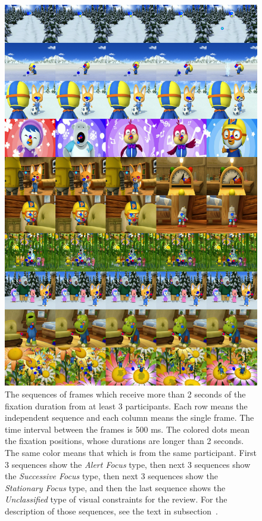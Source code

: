 \documentclass[10pt,letterpaper]{article}
\begin{document}
\begin{figure}
  \centerline{\includegraphics[width=120mm]{./eps/long_fixations_types.png}}
  \caption{The sequences of frames which receive more than 2 seconds of the fixation duration from at least 3 participants. Each row means the independent sequence and each column means the single frame. The time interval between the frames is 500 ms. The colored dots mean the fixation positions, whose durations are longer than 2 seconds. The same color means that which is from the same participant. First 3 sequences show the \textit{Alert Focus} type, then next 3 sequences show the \textit{Successive Focus} type, then next 3 sequences show the \textit{Stationary Focus} type, and then the last sequence shows the \textit{Unclassified} type of visual constraints for the review. For the description of those sequences, see the text in subsection~\textit{}.}
  \label{fig:long-fixations}
\end{figure}
\end{document}
